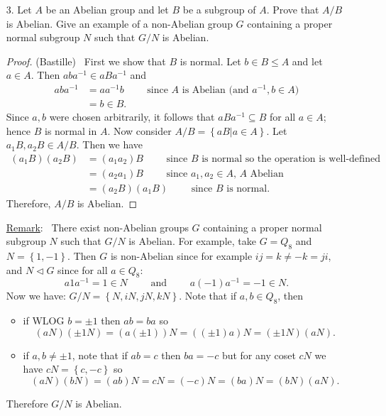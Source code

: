\documentclass[10pt]{article}
\theoremstyle{plain}
\begin{document}
\begin{itemize}

\item[3.] Let $A$ be an Abelian group and let $B$ be a subgroup of $A$. Prove that $A/B$ is Abelian. Give an example of a non-Abelian group $G$ containing a proper normal subgroup $N$ such that $G/N$ is Abelian.

\begin{proof}(Bastille) \ First we show that $B$ is normal. Let $b \in B \leq A$ and let $a \in A$. Then $aba^{-1} \in aBa^{-1}$ and
\begin{align*}
aba^{-1}&= aa^{-1}b \qquad \text{ since $A$ is Abelian (and $a^{-1},b \in A$)} \\
				&= b \in B. 
\end{align*}
Since $a,b$ were chosen arbitrarily, it follows that $aBa^{-1} \subseteq B$ for all $a \in A$; hence $B$ is normal in $A$. Now consider $A/B=\left\{aB | a \in A \right\}$. Let $a_1B, a_2B \in A/B$. Then we have
\begin{align*}
\left(a_1B\right)\left(a_2B\right) &= (a_1a_2)B \qquad \text{ since $B$ is normal so the operation is well-defined} \\
																	 &= (a_2a_1)B \qquad \text{ since $a_1,a_2 \in A$, $A$ Abelian} \\
																	 &= \left(a_2B\right)\left(a_1B\right) \qquad \text{ since $B$ is normal.}
\end{align*}
Therefore, $A/B$ is Abelian.
\end{proof}
\underline{Remark}: \
There exist non-Abelian groups $G$ containing a proper normal subgroup $N$ such that $G/N$ is Abelian. For example, take $G=Q_8$ and $N=\left\{1,-1\right\}$. Then $G$ is non-Abelian since for example $ij=k \neq -k=ji$, and $N \lhd G$ since for all $a \in Q_8$:
\begin{equation*}
a1a^{-1}=1 \in N \qquad \text{ and } \qquad a(-1)a^{-1}=-1 \in N.
\end{equation*}
Now we have: $G/N = \left\{N, iN, jN, kN \right\}$. Note that if $a,b \in Q_8$, then
\begin{itemize}
\item if WLOG $b=\pm 1$ then $ab=ba$ so 
\begin{equation*}
\left(aN\right)\left(\pm1N\right) = \left(a\left(\pm1\right)\right)N = \left(\left(\pm1\right)a\right)N=\left(\pm1N\right)\left(aN\right).
\end{equation*}
\item if $a,b \neq \pm 1$, note that if $ab=c$ then $ba=-c$ but for any coset $cN$ we have $cN=\left\{c,-c\right\}$ so
\begin{equation*}
\left(aN\right)\left(bN\right) = \left(ab\right)N = cN=(-c)N=(ba)N=\left(bN\right)\left(aN\right).
\end{equation*}
\end{itemize}
Therefore $G/N$ is Abelian.


\end{itemize}
\end{document}
